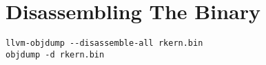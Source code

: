\section{Disassembling The Binary}

\begin{verbatim}
llvm-objdump --disassemble-all rkern.bin
objdump -d rkern.bin
\end{verbatim}